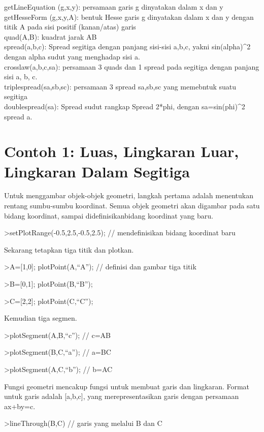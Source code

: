 \documentclass[
]{book}
\begin{document}
getLineEquation (g,x,y): persamaan garis g dinyatakan dalam x dan y\\
getHesseForm (g,x,y,A): bentuk Hesse garis g dinyatakan dalam x dan y dengan titik A pada sisi positif (kanan/atas) garis\\
quad(A,B): kuadrat jarak AB\\
spread(a,b,c): Spread segitiga dengan panjang sisi-sisi a,b,c, yakni sin(alpha)\^{}2 dengan alpha sudut yang menghadap sisi a.\\
crosslaw(a,b,c,sa): persamaan 3 quads dan 1 spread pada segitiga dengan panjang sisi a, b, c.\\
triplespread(sa,sb,sc): persamaan 3 spread sa,sb,sc yang memebntuk suatu segitiga\\
doublespread(sa): Spread sudut rangkap Spread 2*phi, dengan sa=sin(phi)\^{}2 spread a.

\section{Contoh 1: Luas, Lingkaran Luar, Lingkaran Dalam Segitiga}\label{contoh-1-luas-lingkaran-luar-lingkaran-dalam-segitiga}

Untuk menggambar objek-objek geometri, langkah pertama adalah menentukan rentang sumbu-sumbu koordinat. Semua objek geometri akan digambar pada satu bidang koordinat, sampai didefinisikanbidang koordinat yang baru.

\textgreater setPlotRange(-0.5,2.5,-0.5,2.5); // mendefinisikan bidang koordinat baru

Sekarang tetapkan tiga titik dan plotkan.

\textgreater A={[}1,0{]}; plotPoint(A,``A''); // definisi dan gambar tiga titik

\textgreater B={[}0,1{]}; plotPoint(B,``B'');

\textgreater C={[}2,2{]}; plotPoint(C,``C'');

Kemudian tiga segmen.

\textgreater plotSegment(A,B,``c''); // c=AB

\textgreater plotSegment(B,C,``a''); // a=BC

\textgreater plotSegment(A,C,``b''); // b=AC

Fungsi geometri mencakup fungsi untuk membuat garis dan lingkaran. Format untuk garis adalah {[}a,b,c{]}, yang merepresentasikan garis dengan persamaan ax+by=c.

\textgreater lineThrough(B,C) // garis yang melalui B dan C
\end{document}
